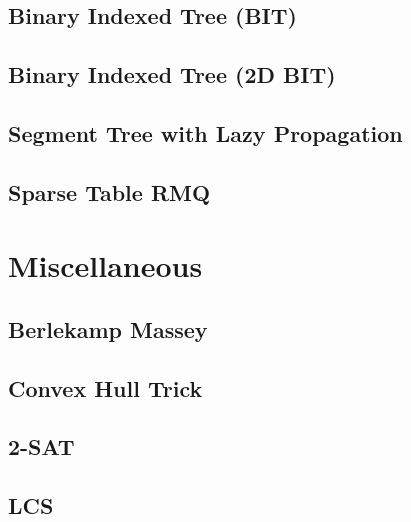 \documentclass[12pt]{extarticle}
\begin{document}
\begin{multicols*}{2}
\subsection{Binary Indexed Tree (BIT)} %


\subsection{Binary Indexed Tree (2D BIT)} %


\subsection{Segment Tree with Lazy Propagation} %


\subsection{Sparse Table RMQ} %


\section{Miscellaneous}

% 

\subsection{Berlekamp Massey} %


\subsection{Convex Hull Trick} %


\subsection{2-SAT} %


\subsection{LCS} %



\end{multicols*}
\end{document}
